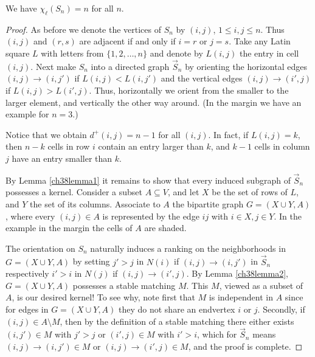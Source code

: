 \begin{theorem}
  \label{ch38theorem}
  We have $\chi_\ell(S_n) = n$ for all $n$.
\end{theorem}
\begin{proof}
As before we denote the vertices of $S_n$ by $(i, j)$, $1 \leq i, j \leq n$. Thus $(i, j)$ and
$(r, s)$ are adjacent if and only if $i = r$ or $j = s$. Take any Latin square $L$ with letters
from $\{1, 2, \dots, n\}$ and denote by $L(i, j)$ the entry in cell $(i, j)$. Next make $S_n$ into
a directed graph $\vec{S}_n$ by orienting the horizontal edges $(i, j) \rightarrow (i, j')$ if
$L(i, j) < L(i, j')$ and the vertical edges $(i, j) \rightarrow (i', j)$ if $L(i, j) > L(i', j)$.
Thus, horizontally we orient from the smaller to the larger element, and vertically the other
way around. (In the margin we have an example for $n = 3$.)

Notice that we obtain $d^+(i, j) = n - 1$ for all $(i, j)$. In fact, if $L(i, j) = k$, then $n - k$
cells in row $i$ contain an entry larger than $k$, and $k - 1$ cells in column $j$ have an entry
 smaller than $k$.

By Lemma \ref{ch38lemma1} it remains to show that every induced subgraph of $\vec{S}_n$ possesses a kernel.
Consider a subset $A \subseteq V$, and let $X$ be the set of rows of $L$, and $Y$ the set of
its columns. Associate to $A$ the bipartite graph $G = (X \cup Y, A)$, where every $(i, j) \in A$ is
represented by the edge $ij$ with $i \in X, j \in Y$. In the example in the margin the cells of $A$
are shaded.

The orientation on $S_n$ naturally induces a ranking on the neighborhoods in $G = (X \cup Y, A)$
by setting $j' > j$ in $N(i)$ if $(i, j) \rightarrow (i, j')$ in $\vec{S}_n$
respectively $i' > i$ in $N(j)$ if $(i, j) \rightarrow (i', j)$. By Lemma \ref{ch38lemma2},
 $G = (X \cup Y, A)$
possesses a stable matching $M$. This $M$, viewed as a subset of $A$, is our desired kernel!
To see why, note first that $M$ is independent in $A$ since for edges in $G = (X \cup Y, A)$
they do not share an endvertex $i$ or $j$. Secondly, if $(i, j) \in A \setminus M$, then by the
definition of a stable matching there either exists $(i, j') \in M$ with $j' > j$ or
$(i', j) \in M$ with $i' > i$, which for $\vec{S}_n$ means $(i, j) \rightarrow (i, j') \in M$
 or $(i, j) \rightarrow (i', j) \in M$, and the proof is complete.
\end{proof}
